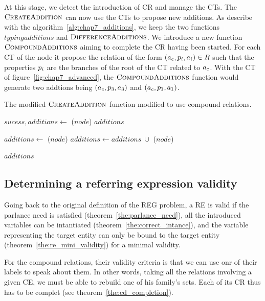 At this stage, we detect the introduction of CR and manage the CTs. The $\textsc{CreateAddition}$ can now use the CTs to propose new additions. As describe with the algorithm~\ref{alg:chap7_additions}, we keep the two functions $typingadditions$ and $\textsc{DifferenceAdditions}$. We introduce a new function $\textsc{CompoundAdditions}$ aiming to complete the CR having been started. For each CT of the node it propose the relation of the form $(a_c, p_i, a_i) \in R$ such that the properties $p_i$ are the branches of the root of the CT related to $a_c$. With the  CT of figure~\ref{fig:chap7_advanced}, the $\textsc{CompoundAdditions}$ function would generate two addtions being $(a_c, p_3, a_3)$ and $(a_c, p_1, a_1)$.

\begin{algorithm}[htb!]
\caption{\label{alg:chap7_additions} The modified $\textsc{CreateAddition}$ function modified to use compound relations. }

\begin{algorithmic}

        \State $sucess, additions\leftarrow$ \typingadditions($node$)
            \Return $additions$
        \EndIf
        
        \State $additions\leftarrow$ \compoundadditions($node$) 
        \State $additions\leftarrow additions\ \cup$ \differenceadditions($node$) 
        
        \Return $additions$
    \EndFunction
    
\end{algorithmic}
\end{algorithm}


\subsection{Determining a referring expression validity}

Going back to the original definition of the REG problem, a RE is valid if the parlance need is satisfied (theorem~\ref{the:parlance_need}), all the introduced variables can be intantiated (theorem~\ref{the:correct_intance}), and the variable representing the target entity can only be bound to the target entity (theorem~\ref{the:re_mini_validity}) for a minimal validity.

For the compound relations, their validity criteria is that we can use onr of their labels to speak about them. In other words, taking all the relations involving a given CE, we must be able to rebuild one of his family's sets. Each of its CR thus has to be complet (see theorem~\ref{the:cd_completion}).

